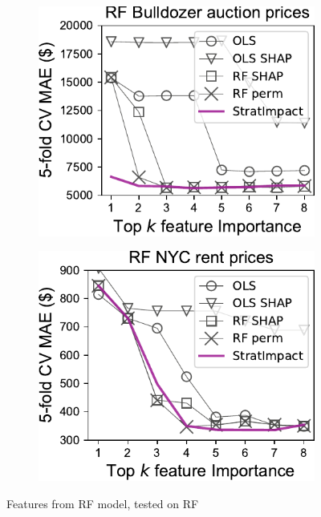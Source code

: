 \documentclass[twoside,11pt]{article}
\begin{document}
\begin{figure}
\begin{subfigure}{.23\textwidth}
\end{subfigure}
\hfill
\begin{subfigure}{.25\textwidth}
    \centering
\includegraphics[scale=0.5]{images/bulldozer-topk-RF-Importance.pdf}
\end{subfigure}%
\hfill
\begin{subfigure}{.2\textwidth}
    \centering
\includegraphics[scale=0.5]{images/rent-topk-RF-Importance.pdf}
\end{subfigure}
\caption[short]{Features from RF model, tested on RF}
\label{fig:topk}
\end{figure}
\end{document}
